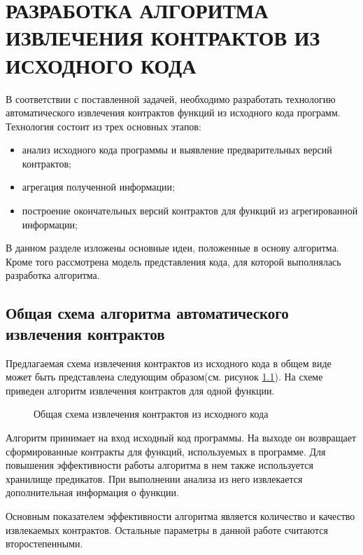 \chapter{РАЗРАБОТКА АЛГОРИТМА ИЗВЛЕЧЕНИЯ КОНТРАКТОВ ИЗ ИСХОДНОГО КОДА}
\label{chapter:algoritm}
В соответствии с поставленной задачей, необходимо разработать технологию автоматического извлечения контрактов функций из исходного кода программ. Технология состоит из трех основных этапов:
\begin{itemize}
\item анализ исходного кода программы и выявление предварительных версий контрактов;
\item агрегация полученной информации;
\item построение окончательных версий контрактов для функций из агрегированной  информации;
\end{itemize}

В данном разделе изложены основные идеи, положенные в основу алгоритма. Кроме того рассмотрена модель представления кода, для которой выполнялась разработка алгоритма.

\section{Общая схема алгоритма автоматического извлечения контрактов}
Предлагаемая схема извлечения контрактов из исходного кода в общем виде может быть представлена следующим образом(см. рисунок \ref{image:generalScheme}). На схеме приведен алгоритм извлечения контрактов для одной функции.
\begin{figure}[h!]
\caption{Общая схема извлечения контрактов из исходного кода}
\label{image:generalScheme}
\end{figure}

Алгоритм принимает на вход исходный код программы. На выходе он возвращает сформированные контракты для функций, используемых в программе. Для повышения эффективности работы алгоритма в нем также используется хранилище предикатов. При выполнении анализа из него извлекается дополнительная информация о функции.

Основным показателем эффективности алгоритма является количество и качество извлекаемых контрактов. Остальные параметры в данной работе считаются второстепенными.

